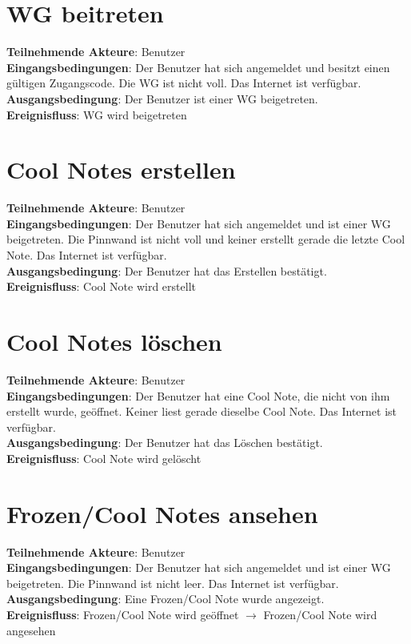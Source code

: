 \documentclass[a4paper]{scrreprt}
\begin{document}
		\section{WG beitreten}
		\textbf{Teilnehmende Akteure}: Benutzer \\
		\textbf{Eingangsbedingungen}: Der Benutzer hat sich angemeldet und besitzt einen gültigen Zugangscode. Die WG ist nicht voll. Das Internet ist verfügbar. \\
		\textbf{Ausgangsbedingung}: Der Benutzer ist einer WG beigetreten. \\
		\textbf{Ereignisfluss}: WG wird beigetreten
		
		\section{Cool Notes erstellen}
		\textbf{Teilnehmende Akteure}: Benutzer \\
		\textbf{Eingangsbedingungen}: Der Benutzer hat sich angemeldet und ist einer WG beigetreten. Die Pinnwand ist nicht voll und keiner erstellt gerade die letzte Cool Note. Das Internet ist verfügbar. \\
		\textbf{Ausgangsbedingung}: Der Benutzer hat das Erstellen bestätigt. \\
		\textbf{Ereignisfluss}: Cool Note wird erstellt
		
		\section{Cool Notes löschen}
		\textbf{Teilnehmende Akteure}: Benutzer \\
		\textbf{Eingangsbedingungen}: Der Benutzer hat eine Cool Note, die nicht von ihm erstellt wurde, geöffnet. Keiner liest gerade dieselbe Cool Note. Das Internet ist verfügbar. \\
		\textbf{Ausgangsbedingung}: Der Benutzer hat das Löschen bestätigt. \\
		\textbf{Ereignisfluss}: Cool Note wird gelöscht
		
		\section{Frozen/Cool Notes ansehen}
		\textbf{Teilnehmende Akteure}: Benutzer \\
		\textbf{Eingangsbedingungen}: Der Benutzer hat sich angemeldet und ist einer WG beigetreten. Die Pinnwand ist nicht leer. Das Internet ist verfügbar. \\
		\textbf{Ausgangsbedingung}: Eine Frozen/Cool Note wurde angezeigt. \\
		\textbf{Ereignisfluss}: Frozen/Cool Note wird geöffnet $\rightarrow$ Frozen/Cool Note wird angesehen
		
\end{document}
